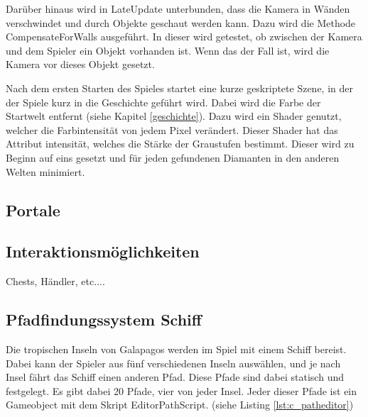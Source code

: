 Darüber hinaus wird in LateUpdate unterbunden, dass die Kamera in Wänden verschwindet und durch Objekte geschaut werden kann. Dazu wird die Methode CompensateForWalls ausgeführt. In dieser wird getestet, ob zwischen der Kamera und dem Spieler ein Objekt vorhanden ist. Wenn das der Fall ist, wird die Kamera vor dieses Objekt gesetzt.

Nach dem ersten Starten des Spieles startet eine kurze geskriptete Szene, in der der Spiele kurz in die Geschichte geführt wird. Dabei wird die Farbe der Startwelt entfernt  (siehe Kapitel \ref{geschichte}). Dazu wird ein Shader genutzt, welcher die Farbintensität von jedem Pixel verändert. Dieser Shader hat das Attribut intensität, welches die Stärke der Graustufen bestimmt. Dieser wird zu Beginn auf eins gesetzt und für jeden gefundenen Diamanten in den anderen Welten minimiert.
    
\subsection{Portale}


\subsection{Interaktionsmöglichkeiten}
Chests, Händler, etc....


\subsection{Pfadfindungssystem Schiff}
Die tropischen Inseln von Galapagos werden im Spiel mit einem Schiff bereist. Dabei kann der Spieler aus fünf verschiedenen Inseln auswählen, und je nach Insel fährt das Schiff einen anderen Pfad. Diese Pfade sind dabei statisch und festgelegt. Es gibt dabei 20 Pfade, vier von jeder Insel. Jeder dieser Pfade ist ein Gameobject mit dem Skript EditorPathScript. (siehe Listing \ref{lst:c_patheditor})

